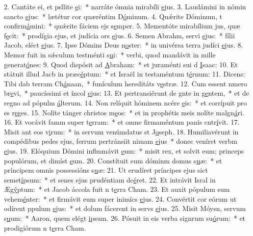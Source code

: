 2. Cantáte ei, et psllite \uline{e}i:~* narráte ómnia mirabíli \uline{e}jus.
3. Laudámini in nómin sancto \uline{e}jus:~* lætétur cor quæréntim D\uline{ó}minum.
4. Quǽrite Dóminum, t confirm\uline{á}mini:~* quǽrite fáciem ejs s\uline{e}mper.
5. Mementóte mirabílium jus, quæ f\uline{e}cit:~* prodígia ejus, et judícia ors \uline{e}jus.
6. Semen Abrahm, servi \uline{e}jus:~* fílii Jacob, eléct \uline{e}jus.
7. Ipse Dómins Deus n\uline{o}ster:~* in univérsa terra judíci \uline{e}jus.
8. Memor fuit in sǽculum testménti s\uline{u}i:~* verbi, quod mandávit in mille generat\uline{ó}nes:
9. Quod dispósit ad \uline{A}braham:~* et juraménti sui d \uline{I}saac:
10. Et státuit illud Jacb in præc\uline{é}ptum:~* et Israël in testaméntum t\uline{é}rnum:
11. Dicens: Tibi dab terram Ch\uline{á}naan,~* funículum hereditáts v\uline{e}stræ.
12. Cum essent nmero br\uline{e}vi,~* paucíssimi et íncol \uline{e}jus:
13. Et pertransiérunt de gnte in g\uline{e}ntem,~* et de regno ad pópulm \uline{á}lterum.
14. Non relíquit hóminem ncére \uline{e}is:~* et corrípuit pro es r\uline{e}ges.
15. Nolíte tánger christos m\uline{e}os:~* et in prophétis meis nolíte malgn\uline{á}ri.
16. Et vocávit famm super t\uline{e}rram:~* et omne firmaméntum panis cntr\uline{í}vit.
17. Misit ant eos v\uline{i}rum:~* in servum venúmdatus st J\uline{o}seph.
18. Humiliavérunt in compédibus pedes ejus, ferrum pertránsiit nimam \uline{e}jus~* donec veníret verbm \uline{e}jus.
19. Elóquium Dómini inflmmávit \uline{e}um:~* misit rex, et solvit eum; princeps populórum, et dimíst \uline{e}um.
20. Constítuit eum dóminm domus s\uline{u}æ:~* et príncipem omnis possessións s\uline{u}æ:
21. Ut erudíret príncipes ejus sict semet\uline{í}psum:~* et senes ejus prudéntiam dc\uline{é}ret.
22. Et intrávit Isral in Æg\uline{ý}ptum:~* et Jacob áccola fuit n t\uline{e}rra Cham.
23. Et auxit pópulum sum vehem\uline{é}nter:~* et firmávit eum super inimícs \uline{e}jus.
24. Convértit cor eórum ut odírent ppulum \uline{e}jus:~* et dolum fácerent in servs \uline{e}jus.
25. Misit Móysn, servum s\uline{u}um:~* Aaron, quem elégt \uline{i}psum.
26. Pósuit in eis verba signrum su\uline{ó}rum:~* et prodigiórum n t\uline{e}rra Cham.
